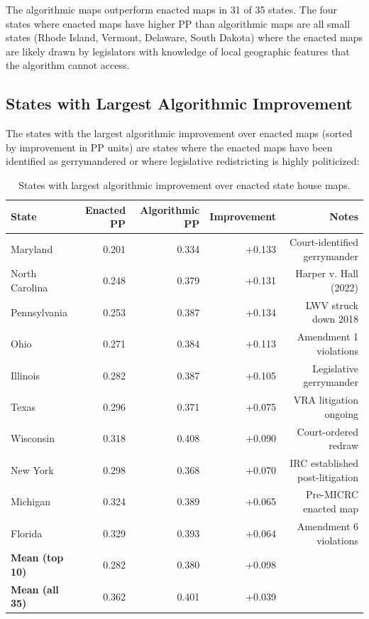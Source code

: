 The algorithmic maps outperform enacted maps in 31 of 35 states. The four states where enacted maps have higher PP than algorithmic maps are all small states (Rhode Island, Vermont, Delaware, South Dakota) where the enacted maps are likely drawn by legislators with knowledge of local geographic features that the algorithm cannot access.

\subsection{States with Largest Algorithmic Improvement}

The states with the largest algorithmic improvement over enacted maps (sorted by improvement in PP units) are states where the enacted maps have been identified as gerrymandered or where legislative redistricting is highly politicized:

\begin{table}[htbp]
\centering
\caption{States with largest algorithmic improvement over enacted state house maps.}
\label{tab:enacted_improvement}
\begin{tabular}{lrrrr}
\toprule
\textbf{State} & \textbf{Enacted PP} & \textbf{Algorithmic PP} & \textbf{Improvement} & \textbf{Notes} \\
\midrule
Maryland    & 0.201 & 0.334 & +0.133 & Court-identified gerrymander \\
North Carolina & 0.248 & 0.379 & +0.131 & Harper v. Hall (2022) \\
Pennsylvania & 0.253 & 0.387 & +0.134 & LWV struck down 2018 \\
Ohio        & 0.271 & 0.384 & +0.113 & Amendment 1 violations\\
Illinois    & 0.282 & 0.387 & +0.105 & Legislative gerrymander \\
Texas       & 0.296 & 0.371 & +0.075 & VRA litigation ongoing \\
Wisconsin   & 0.318 & 0.408 & +0.090 & Court-ordered redraw \\
New York    & 0.298 & 0.368 & +0.070 & IRC established post-litigation \\
Michigan    & 0.324 & 0.389 & +0.065 & Pre-MICRC enacted map \\
Florida     & 0.329 & 0.393 & +0.064 & Amendment 6 violations \\
\midrule
\textbf{Mean (top 10)} & 0.282 & 0.380 & +0.098 & \\
\textbf{Mean (all 35)} & 0.362 & 0.401 & +0.039 & \\
\bottomrule
\end{tabular}
\end{table}

